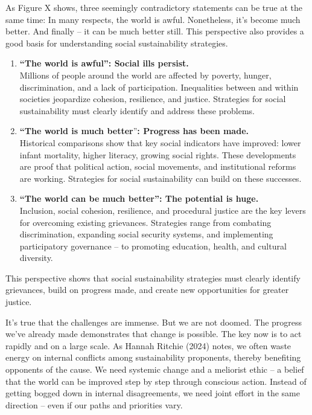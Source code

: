 \documentclass[
  a4paper,
  openany]{book}
\begin{document}
As Figure X shows, three seemingly contradictory statements can be true
at the same time: In many respects, the world is awful. Nonetheless,
it's become much better. And finally -- it can be much better still.
This perspective also provides a good basis for understanding social
sustainability strategies.

\begin{enumerate}
\def\labelenumi{\arabic{enumi}.}
\item
  \textbf{``The world is awful'': Social ills persist.}\\
  Millions of people around the world are affected by poverty, hunger,
  discrimination, and a lack of participation. Inequalities between and
  within societies jeopardize cohesion, resilience, and justice.
  Strategies for social sustainability must clearly identify and address
  these problems.
\item
  \textbf{``The world is much better}''\textbf{: Progress has been
  made.}\\
  Historical comparisons show that key social indicators have improved:
  lower infant mortality, higher literacy, growing social rights. These
  developments are proof that political action, social movements, and
  institutional reforms are working. Strategies for social
  sustainability can build on these successes.
\item
  \textbf{``The world can be much better'': The potential is huge.}\\
  Inclusion, social cohesion, resilience, and procedural justice are the
  key levers for overcoming existing grievances. Strategies range from
  combating discrimination, expanding social security systems, and
  implementing participatory governance -- to promoting education,
  health, and cultural diversity.
\end{enumerate}

This perspective shows that social sustainability strategies must
clearly identify grievances, build on progress made, and create new
opportunities for greater justice.

It's true that the challenges are immense. But we are not doomed. The
progress we've already made demonstrates that change is possible. The
key now is to act rapidly and on a large scale. As Hannah Ritchie (2024)
notes, we often waste energy on internal conflicts among sustainability
proponents, thereby benefiting opponents of the cause. We need systemic
change and a meliorist ethic -- a belief that the world can be improved
step by step through conscious action. Instead of getting bogged down in
internal disagreements, we need joint effort in the same direction --
even if our paths and priorities vary.
\end{document}
